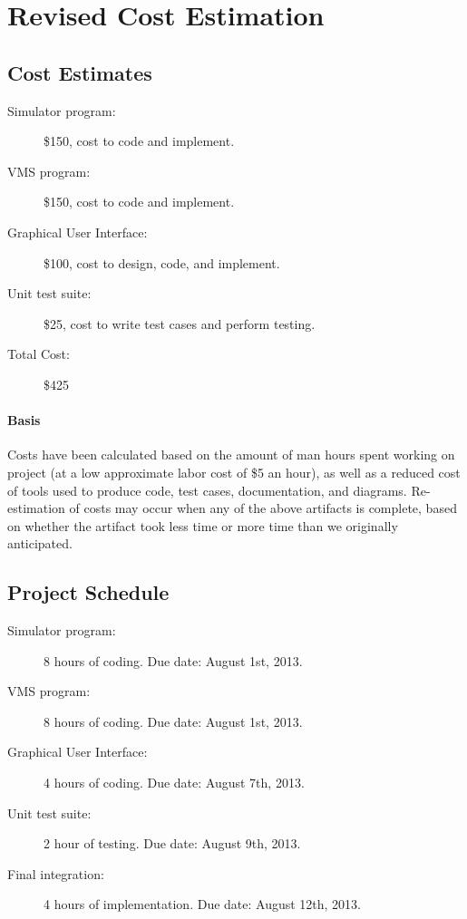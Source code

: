 \documentclass{article}
\begin{document}
\section{Revised Cost Estimation} %

\subsection{Cost Estimates}

\begin{description}
  \item[Simulator program:] \$150, cost to code and implement.
  \item[VMS program:] \$150, cost to code and implement.
  \item[Graphical User Interface:] \$100, cost to design, code, and implement.
  \item[Unit test suite:] \$25, cost to write test cases and perform testing.
  \item[Total Cost:] \$425
\end{description}

\paragraph{Basis} Costs have been calculated based on the amount of man hours spent working on project (at a low approximate labor cost of \$5 an hour), as well as a reduced cost of tools used to produce code, test cases, documentation, and diagrams.
Re-estimation of costs may occur when any of the above artifacts is complete, based on whether the artifact took less time or more time than we originally anticipated.

\subsection{Project Schedule}

\begin{description}
  \item[Simulator program:] 8 hours of coding. Due date: August 1st, 2013.
  \item[VMS program:] 8 hours of coding. Due date: August 1st, 2013.
  \item[Graphical User Interface:] 4 hours of coding. Due date: August 7th, 2013.
  \item[Unit test suite:] 2 hour of testing. Due date: August 9th, 2013.
  \item[Final integration:] 4 hours of implementation. Due date: August 12th, 2013.
\end{description}
\end{document}
